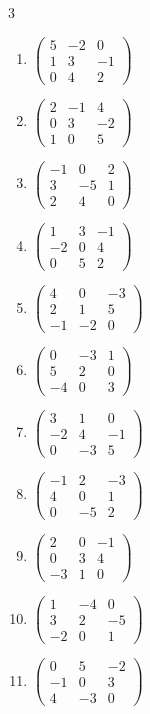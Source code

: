 \begin{multicols}{3}
\begin{enumerate}[label=\arabic*.,  leftmargin=*]
\item $\begin{pmatrix}5&-2&0\\1&3&-1\\0&4&2\end{pmatrix}$
\item $\begin{pmatrix}2&-1&4\\0&3&-2\\1&0&5\end{pmatrix}$
\item $\begin{pmatrix}-1&0&2\\3&-5&1\\2&4&0\end{pmatrix}$
\item $\begin{pmatrix}1&3&-1\\-2&0&4\\0&5&2\end{pmatrix}$
\item $\begin{pmatrix}4&0&-3\\2&1&5\\-1&-2&0\end{pmatrix}$
\item $\begin{pmatrix}0&-3&1\\5&2&0\\-4&0&3\end{pmatrix}$
\item $\begin{pmatrix}3&1&0\\-2&4&-1\\0&-3&5\end{pmatrix}$
\item $\begin{pmatrix}-1&2&-3\\4&0&1\\0&-5&2\end{pmatrix}$
\item $\begin{pmatrix}2&0&-1\\0&3&4\\-3&1&0\end{pmatrix}$
\item $\begin{pmatrix}1&-4&0\\3&2&-5\\-2&0&1\end{pmatrix}$
\item $\begin{pmatrix}0&5&-2\\-1&0&3\\4&-3&0\end{pmatrix}$

\end{enumerate}
\end{multicols}
